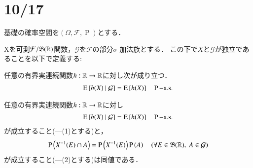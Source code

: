 \section{10/17}
	基礎の確率空間を$(\Omega,\mathcal{F},\operatorname{P})$とする．
	\begin{dfn}[独立性]
		Xを可測$\mathcal{F}/\mathfrak{B}(\mathbb{R})$関数，$\mathcal{G}$を$\mathcal{F}$の部分$\sigma$-加法族とする．
		この下で$X$と$\mathcal{G}$が独立であることを以下で定義する:
		
		任意の有界実連続関数$h:\mathbb{R} \rightarrow \mathbb{R}$に対し次が成り立つ．
		\begin{align}
			\operatorname{E} \left[ h(X) \ \middle|\ \mathcal{G} \right] = \operatorname{E} \left[ h(X) \right] \quad \operatorname{P}\mathrm{-a.s.}
		\end{align}
	\end{dfn}
	
	\begin{prp}[独立性の同値条件]
		任意の有界実連続関数$h:\mathbb{R} \rightarrow \mathbb{R}$に対し
		\begin{align}
			\operatorname{E} \left[ h(X) \ \middle|\ \mathcal{G} \right] = \operatorname{E} \left[ h(X) \right] \quad \operatorname{P}\mathrm{-a.s.}
		\end{align}
		が成立すること(---(1)とする)と，
		\begin{align}
			\operatorname{P} \left(X^{-1}(E) \cap A\right) = \operatorname{P} \left(X^{-1}(E)\right)\operatorname{P} \left(A\right) \quad (\forall E \in \mathfrak{B}(\mathbb{R}),\ A \in \mathcal{G})
		\end{align}
		が成立すること(---(2)とする)は同値である．
	\end{prp}
	
